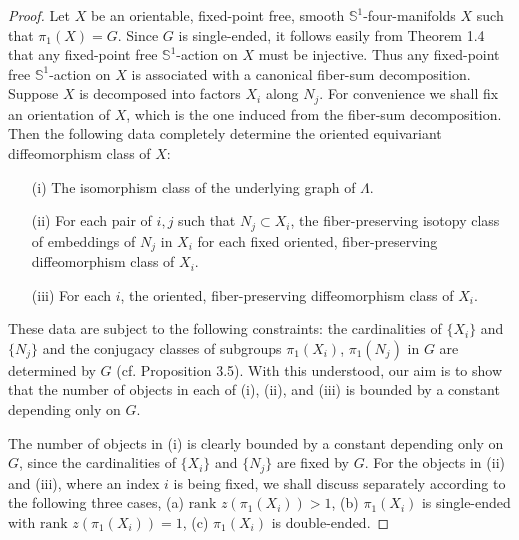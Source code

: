 \documentclass[11pt]{amsart}
\theoremstyle{plain}
\numberwithin{theorem}{section}
\theoremstyle{definition}
\begin{document}
\begin{proof}
Let $X$ be an orientable, fixed-point free, smooth ${{\mathbb S}}^1$-four-manifolds $X$ such that 
$\pi_1(X)=G$. Since $G$ is single-ended, it follows easily from Theorem 1.4 that any fixed-point free
${{\mathbb S}}^1$-action on $X$ must be injective. Thus any fixed-point free ${{\mathbb S}}^1$-action on $X$ is associated with 
a canonical fiber-sum decomposition. 
Suppose $X$ is decomposed into factors $X_i$ along $N_j$. For convenience we shall fix an orientation
of $X$, which is the one induced from the fiber-sum decomposition. Then the following data completely determine the oriented equivariant diffeomorphism class of $X$:

\begin{itemize}
\item [{(i)}] The isomorphism class of the underlying graph of $\Lambda$.
\item [{(ii)}] For each pair of $i,j$ such that $N_j\subset X_i$, the fiber-preserving isotopy 
class of embeddings of $N_j$ in $X_i$ for each fixed  oriented, fiber-preserving
diffeomorphism class of $X_i$.
\item [{(iii)}] For each $i$, the oriented, fiber-preserving diffeomorphism class of $X_i$.
\end{itemize}

These data are subject to the following constraints: the cardinalities of $\{X_i\}$ and $\{N_j\}$ 
and the conjugacy classes of subgroups $\pi_1(X_i)$, $\pi_1(N_j)$ in $G$ are determined by 
$G$ (cf. Proposition 3.5). With this understood, our aim is to show that the number of objects in 
each of (i), (ii), and (iii) is bounded by a constant depending only on $G$. 

The number of objects in (i) is clearly bounded by a constant depending only on $G$, since 
the cardinalities of $\{X_i\}$ and $\{N_j\}$ are fixed by $G$. For the objects in (ii) and (iii), where
an index $i$ is being fixed, we shall discuss separately according to the following three cases, 
(a) $\text{rank }z(\pi_1(X_i))>1$, (b) $\pi_1(X_i)$ is single-ended with $\text{rank }z(\pi_1(X_i))=1$,
(c) $\pi_1(X_i)$ is double-ended. 


\end{proof}
\end{document}
